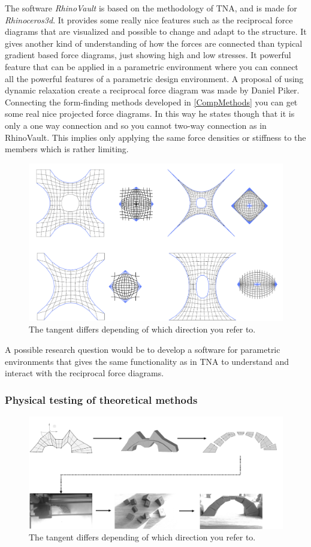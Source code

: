 The software \textit{RhinoVault} is based on the methodology of TNA, and is made for \textit{Rhinoceros3d}. It provides some really nice features such as the reciprocal force diagrams that are visualized and possible to change and adapt to the structure. It gives another kind of understanding of how the forces are connected than typical gradient based force diagrams, just showing high and low stresses. It powerful feature that can be applied in a parametric environment where you can connect all the powerful features of a parametric design environment. A proposal of using dynamic relaxation create a reciprocal force diagram was made by Daniel Piker. Connecting the form-finding methods developed in \ref{CompMethods} you can get some real nice projected force diagrams. In this way he states though that it is only a one way connection and so you cannot two-way connection as in RhinoVault. This implies only applying the same force densities or stiffness to the members which is rather limiting.

\begin{figure}[H]
\centering
\includegraphics[width=0.9\linewidth ]{figure/Introduction/PreStudyAna.png}
\caption{The tangent differs depending of which direction you refer to. }
\end{figure}

A possible research question would be to develop a software for parametric environments that gives the same functionality as in TNA to understand and interact with the reciprocal force diagrams.

\subsubsection{Physical testing of theoretical methods}
\begin{figure}[H]
\centering
\includegraphics[width=0.9\linewidth ]{figure/Introduction/PreStudyFab.png}
\caption{The tangent differs depending of which direction you refer to. }
\end{figure}


